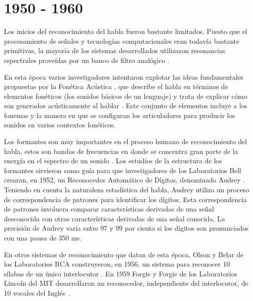 \section{1950 - 1960}
\label{sec:50s}

Los inicios del reconocimiento del habla fueron bastante limitados. Puesto que el procesamiento de se\~{n}ales y 
tecnolog\'{i}as computacionales eran todav\'{i}a bastante primitivas, la mayor\'{i}a de los sistemas desarrollados
utilizaron resonancias espectrales prove\'{i}das por un banco de filtro anal\'{o}gico \cite{Furui50Years2004}.
 
En esta \'{e}poca varios investigadores intentaron
explotar las ideas fundamentales propuestas por la Fon\'{e}tica Ac\'{u}stica \cite{AnusuyaSpeech2009}, que
describe el habla en t\'{e}rminos de elementos fon\'{e}ticos (los sonidos b\'{a}sicos de un lenguaje) y trata de
explicar c\'{o}mo son generados ac\'{u}sticamente al hablar \cite{JuangAutomaticSpeech}. Este conjunto de elementos incluye a los
fonemas y la manera en que se configuran los articuladores para producir los sonidos en varios contextos fon\'{e}ticos.

Los formantes son muy importantes en el proceso humano de reconocimiento del habla, estos son bandas de frecuencias en 
donde se concentra gran parte de la energ\'{i}a en el espectro de un sonido \cite{HawkinsAcoustic2009}. Los estudios
de la estructura de los formantes sirvieron como gu\'{i}a para que investigadores de los Laboratorios Bell crearan, en 1952, 
un Reconocedor Autom\'{a}tico de D\'{i}gitos, denominado Audrey \cite{DavisAutomatic1952}. Teniendo en cuenta la naturaleza
estad\'{i}stica del habla, Audrey utiliza un proceso de correspondencia de patrones para identificar los d\'{i}gitos. Esta
correspondencia de patrones involucra comparar caracter\'{i}sticas derivadas de una se\~{n}al desconocida con
otras caracter\'{i}sticas derivadas de una se\~{n}al conocida. La precisi\'{o}n de Audrey varia entre 97 y 99 por ciento si
los d\'{i}gitos son pronunciados con una pausa de 350 ms.

En otros sistemas de reconocimiento que datan de esta \'{e}poca, Olson y Belar de los Laboratorios RCA construyeron, en 1956,
un sistema para reconocer 10 s\'{i}labas de un \'{u}nico interlocutor \cite{OlsonPhonetic1956}. En 1959 Forgie y Forgie de 
los Laboratorios Lincoln del MIT desarrollaron un reconocedor, independiente del interlocutor, de 10 vocales del
\mbox{Ingl\'{e}s \cite{ForgieResults1959}}.

